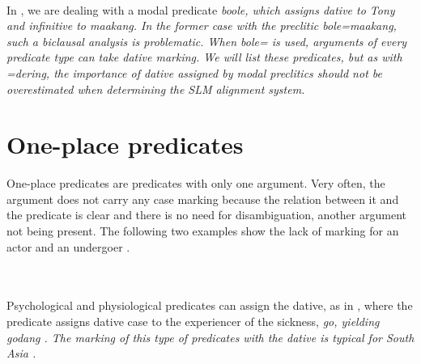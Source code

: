  \\
In , we are dealing with a modal predicate \em boole\em, which assigns dative to \em Tony \em and infinitive to \em maakang\em. In the former case with the preclitic \em bole=maakang\em, such a biclausal analysis is problematic. When \em bole= \em is used, arguments of every predicate type can take dative marking. We will list these predicates, but as with \em =dering\em, the importance of dative assigned by modal preclitics should not be overestimated when determining the SLM alignment system.



\section{One-place predicates}\label{sec:argstr:One-placepredicates}
One-place predicates are predicates with only one argument. Very often, the argument does not carry any case marking because the relation between it and the predicate is clear and there is no need for disambiguation, another argument not being present.  The following two examples show the lack of marking for an actor  and an undergoer .
 
 \\
 \\
Psychological and physiological predicates can assign the dative, as in , where the predicate  assigns dative case to the experiencer of the sickness, \em go\em, yielding \em godang \em \citep[cf.][]{Ansaldo2005ms,Ansaldo2008genesis, Ansaldo2009}. The marking of this type of predicates with the dative is typical for South Asia \citep[159ff]{Masica1976}.
 
